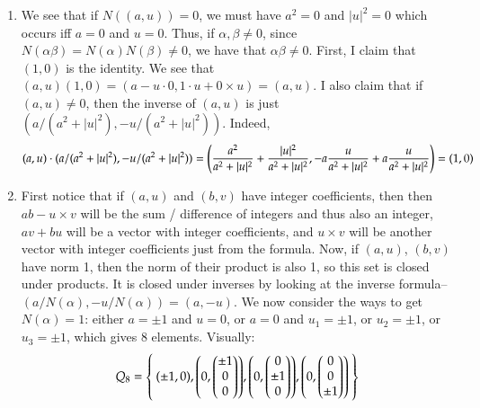\documentclass[12pt]{article}
\theoremstyle{definitionstyle}
\begin{document}
\begin{enumerate}[leftmargin=\labelsep]
\begin{enumerate}
			\item We see that if $N((a, u)) = 0$, we must have $a^2=0$ and $|u|^2 = 0$ which occurs iff $a = 0$ and $u = 0$. Thus, if $\alpha, \beta \neq 0$, since $N(\alpha \beta) = N(\alpha)N(\beta) \neq 0$, we have that $\alpha \beta \neq 0$. First, I claim that $(1, 0)$ is the identity. We see that $(a, u)(1, 0) = (a - u \cdot 0, 1 \cdot u + 0 \times u) = (a, u)$. I also claim that if $(a, u) \neq 0$, then the inverse of $(a, u)$ is just $(a/(a^2+|u|^2), -u/(a^2+|u|^2))$. Indeed, 
			\begin{align*}
				(a, u) \cdot (a/(a^2+|u|^2), -u/(a^2+|u|^2)) = \qty(\frac{a^2}{a^2+|u|^2} + \frac{|u|^2}{a^2+|u|^2}, -a\frac{u}{a^2+|u|^2} + a\frac{u}{a^2+|u|^2}) = (1, 0)
			\end{align*}
			\item First notice that if $(a, u)$ and $(b, v)$ have integer coefficients, then then $ab - u \times v$ will be the sum / difference of integers and thus also an integer, $av+bu$ will be a vector with integer coefficients, and $u \times v$ will be another vector with integer coefficients just from the formula. Now, if $(a, u)$, $(b, v)$ have norm 1, then the norm of their product is also 1, so this set is closed under products. It is closed under inverses by looking at the inverse formula--$(a/N(\alpha), -u/N(\alpha)) = (a, -u)$. We now consider the ways to get $N(\alpha) = 1$: either $a = \pm 1$ and $u = 0$, or $a = 0$ and $u_1 = \pm 1$, or $u_2 = \pm 1$, or $u_3 = \pm 1$, which gives 8 elements. Visually:
			\begin{align*}
				Q_8 = \Set{(\pm1, 0), \qty(0, \begin{pmatrix} \pm 1 \\ 0 \\ 0 \end{pmatrix}), \qty(0, \begin{pmatrix} 0 \\ \pm 1 \\ 0 \end{pmatrix}), \qty(0, \begin{pmatrix} 0 \\ 0 \\ \pm 1 \end{pmatrix})}
			\end{align*}
		\end{enumerate}
	\end{enumerate}
\end{document}
